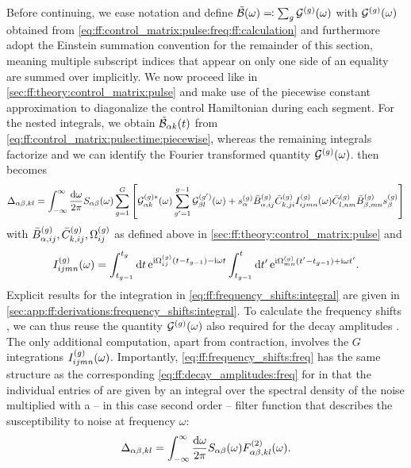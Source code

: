 Before continuing, we ease notation and define $\tilde{\mathcal{B}}(\omega) \eqqcolon \sum_g\mathcal{G}^{(g)}(\omega)$ with $\mathcal{G}^{(g)}(\omega)$ obtained from \cref{eq:ff:control_matrix:pulse:freq:ff:calculation} and furthermore adopt the Einstein summation convention for the remainder of this section, meaning multiple subscript indices that appear on only one side of an equality are summed over implicitly.
We now proceed like in \cref{sec:ff:theory:control_matrix:pulse} and make use of the piecewise constant approximation to diagonalize the control Hamiltonian during each segment.
For the nested integrals, we obtain $\tilde{\mathcal{B}}_{\alpha k}(t)$ from \cref{eq:ff:control_matrix:pulse:time:piecewise}, whereas the remaining integrals factorize and we can identify the Fourier transformed quantity $\mathcal{G}^{(g)}(\omega)$.
 then becomes
\begin{equation}\label{eq:ff:frequency_shifts:freq}
    \Delta_{\alpha\beta,kl} = \int_{-\infty}^\infty\frac{\dd{\omega}}{2\pi} S_{\alpha\beta}(\omega)\sum_{g=1}^G\left[
        \mathcal{G}_{\alpha k}^{(g)\ast}(\omega)\sum_{g'=1}^{g-1}\mathcal{G}_{\beta l}^{(g')}(\omega) +
        s_\alpha^{(g)}\bar{B}_{\alpha,ij}^{(g)}\bar{C}_{k,ji}^{(g)} I_{ijmn}^{(g)}(\omega)
        \bar{C}_{l,nm}^{(g)}\bar{B}_{\beta,mn}^{(g)} s_\beta^{(g)}
    \right]
\end{equation}
with $\bar{B}_{\alpha,ij}^{(g)},\bar{C}_{k,ij}^{(g)},\Omega_{ij}^{(g)}$ as defined above in \cref{sec:ff:theory:control_matrix:pulse} and
\begin{equation}\label{eq:ff:frequency_shifts:integral}
    I_{ijmn}^{(g)}(\omega) = \int_{t_{g-1}}^{t_g}\dd{t}\mathrm{e}^{\mathrm{i}\Omega_{ij}^{(g)}(t - t_{g-1}) - \mathrm{i}\omega t}
                              \int_{t_{g-1}}^{t}\dd{t'}\mathrm{e}^{\mathrm{i}\Omega_{mn}^{(g)}(t' - t_{g-1}) + \mathrm{i}\omega t'}.
\end{equation}
Explicit results for the integration in \cref{eq:ff:frequency_shifts:integral} are given in \cref{sec:app:ff:derivations:frequency_shifts:integral}.
To calculate the frequency shifts \freqshifts, we can thus reuse the quantity $\mathcal{G}^{(g)}(\omega)$ also required for the decay amplitudes \decayamps.
The only additional computation, apart from contraction, involves the $G$ integrations $I_{ijmn}^{(g)}(\omega)$.
Importantly, \cref{eq:ff:frequency_shifts:freq} has the same structure as the corresponding \cref{eq:ff:decay_amplitudes:freq} for \decayamps in that the individual entries of \freqshifts are given by an integral over the spectral density of the noise multiplied with a -- in this case second order -- filter function that describes the susceptibility to noise at frequency $\omega$:
\begin{equation}\label{eq:ff:frequency_shifts:filter_function}
    \Delta_{\alpha\beta,kl} = \int_{-\infty}^\infty\frac{\dd{\omega}}{2\pi} S_{\alpha\beta}(\omega) F_{\alpha\beta,kl}^{(2)}(\omega).
\end{equation}

